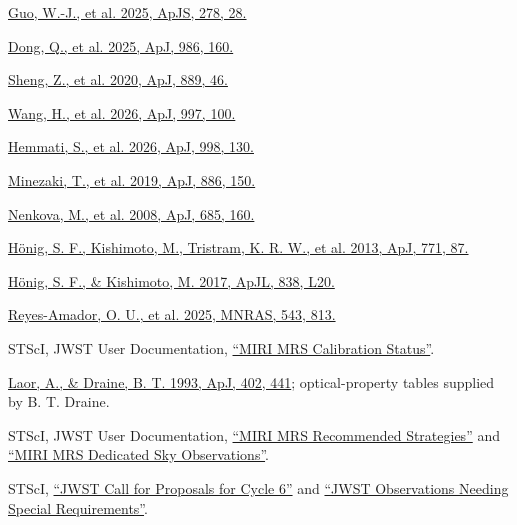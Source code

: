 \documentclass[12pt]{article}
\begin{document}
\noindent [34] \href{https://arxiv.org/abs/2408.00402}{Guo, W.-J., et al. 2025, ApJS, 278, 28.}\par
\noindent [35] \href{https://arxiv.org/abs/2408.07335}{Dong, Q., et al. 2025, ApJ, 986, 160.}\par
\noindent [36] \href{https://doi.org/10.3847/1538-4357/ab5af9}{Sheng, Z., et al. 2020, ApJ, 889, 46.}\par
\noindent [37] \href{https://doi.org/10.3847/1538-4357/ae1fdc}{Wang, H., et al. 2026, ApJ, 997, 100.}\par
\noindent [38] \href{https://doi.org/10.3847/1538-4357/ae38b8}{Hemmati, S., et al. 2026, ApJ, 998, 130.}\par
\noindent [39] \href{https://doi.org/10.3847/1538-4357/ab4f7b}{Minezaki, T., et al. 2019, ApJ, 886, 150.}\par
\noindent [40] \href{https://arxiv.org/abs/0806.0512}{Nenkova, M., et al. 2008, ApJ, 685, 160.}\par
\noindent [41] \href{https://arxiv.org/abs/1306.4312}{H\"onig, S. F., Kishimoto, M., Tristram, K. R. W., et al. 2013, ApJ, 771, 87.}\par
\noindent [42] \href{https://doi.org/10.3847/2041-8213/aa6838}{H\"onig, S. F., \& Kishimoto, M. 2017, ApJL, 838, L20.}\par
\noindent [43] \href{https://doi.org/10.1093/mnras/staf1494}{Reyes-Amador, O. U., et al. 2025, MNRAS, 543, 813.}\par
\noindent [44] STScI, JWST User Documentation, \href{https://jwst-docs.stsci.edu/jwst-calibration-status/miri-calibration-status/miri-mrs-calibration-status}{``MIRI MRS Calibration Status''}.\par
\noindent [45] \href{https://doi.org/10.1086/172149}{Laor, A., \& Draine, B. T. 1993, ApJ, 402, 441}; optical-property tables supplied by B. T. Draine.\par
\noindent [46] STScI, JWST User Documentation, \href{https://jwst-docs.stsci.edu/jwst-mid-infrared-instrument/miri-observing-strategies/miri-mrs-recommended-strategies}{``MIRI MRS Recommended Strategies''} and \href{https://jwst-docs.stsci.edu/jwst-mid-infrared-instrument/miri-operations/miri-dithering/miri-mrs-dedicated-sky-observations}{``MIRI MRS Dedicated Sky Observations''}.\par
\noindent [47] STScI, \href{https://jwst-docs.stsci.edu/jwst-opportunities-and-policies/jwst-call-for-proposals-for-cycle-6}{``JWST Call for Proposals for Cycle 6''} and \href{https://jwst-docs.stsci.edu/jwst-opportunities-and-policies/jwst-call-for-proposals-for-cycle-6/jwst-proposal-types-and-categories/jwst-observations-needing-special-requirements}{``JWST Observations Needing Special Requirements''}.\par
\end{document}
